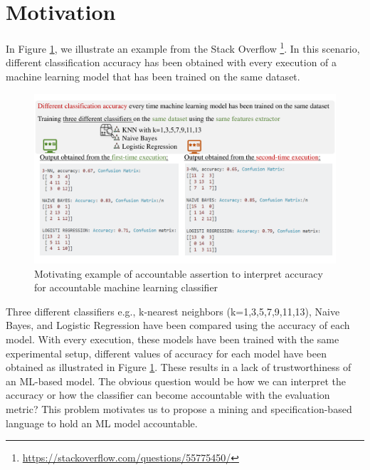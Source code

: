 \section{Motivation}
\label{sec:motivation}

In Figure \ref{fig:motiv}, we illustrate an example from the Stack Overflow  \footnote{\small \url{https://stackoverflow.com/questions/55775450/}}. In this scenario, different classification accuracy has been obtained with every execution of a machine learning model that has been trained on the same dataset. 
\begin{figure}[h]
	\includegraphics[width=\linewidth]{motivfigure.pdf}
	\caption{Motivating example of accountable assertion to interpret accuracy for accountable machine learning classifier}
	\label{fig:motiv}
\end{figure}
Three different classifiers e.g., k-nearest neighbors (k=1,3,5,7,9,11,13), Naive Bayes, and Logistic Regression have been compared using the accuracy of each model. With every execution, these models have been trained with the same experimental setup, different values of accuracy for each model have been obtained as illustrated in Figure \ref{fig:motiv}. These results in a lack of trustworthiness of an ML-based model. The obvious question would be how we can interpret the accuracy or how the classifier can become accountable with the evaluation metric? This problem motivates us to propose a mining and specification-based language to hold an ML model accountable.  

%
%
%
%
%
